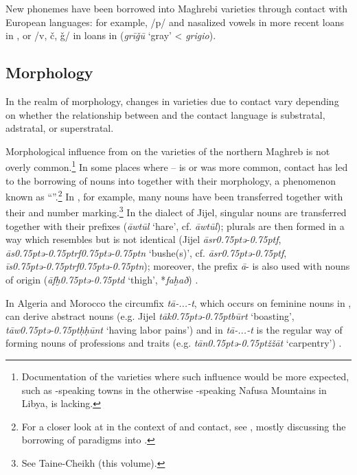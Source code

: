 \documentclass[output=paper]{langsci/langscibook}
\begin{document}
  New phonemes have been borrowed into Maghrebi varieties through contact with European languages: for example, /p/ and nasalized vowels in more recent  loans in  , or /v, č, ǧ/ in  loans in   (\textit{grīǧū} ‘gray’ < \textit{grigio}).

  \subsection{Morphology}\label{Morphology}

In the realm of morphology, changes in  varieties due to contact vary depending on whether the relationship between  and the contact language is substratal, adstratal, or superstratal.

  Morphological influence from  on the  varieties of the northern Maghreb is not overly common.\footnote{Documentation of the varieties where such influence would be more expected, such as -speaking towns in the otherwise -speaking Nafusa Mountains in Libya, is lacking.} In some places where --  is or was more common, contact has led to the borrowing of  nouns into  together with their morphology, a phenomenon known as “”.\footnote{For a closer look at  in the context of  and  contact, see \citet{Kossmann2010}, mostly discussing the borrowing of  paradigms into .} In , for example, many nouns have been transferred together with their  and number marking.\footnote{See Taine-Cheikh (this volume).} In the dialect of Jijel,  singular nouns are transferred together with their prefixes (\textit{āwtūl} ‘hare’, cf.  \textit{āwtūl}); plurals are then formed in a way which resembles  but is not identical (Jijel \textit{āsr\kern 0.75ptǝ\kern -0.75ptf}, \textit{ās\kern 0.75ptǝ\kern -0.75ptrf\kern 0.75ptǝ\kern -0.75ptn} ‘bushe(s)’, cf.   \textit{āsr\kern 0.75ptǝ\kern -0.75ptf}, \textit{īs\kern 0.75ptǝ\kern -0.75ptrf\kern 0.75ptǝ\kern -0.75ptn}); moreover, the prefix \textit{ā}{}- is also used with nouns of  origin (\textit{āfḫ\kern 0.75ptǝ\kern -0.75ptd} ‘thigh’,  *\textit{faḫað}) \citep[302–318]{Marçais1956}.

  In Algeria and Morocco the circumfix \textit{tā-...-t}, which occurs on feminine nouns in , can derive abstract nouns (e.g. Jijel \textit{tāk\kern 0.75ptǝ\kern -0.75ptbūrt} ‘boasting’, \textit{tāw\kern 0.75ptǝ\kern -0.75ptḥḥūnt} ‘having labor pains’) and in   \textit{tā-...-t} is the regular way of forming nouns of professions and traits (e.g. \textit{tān\kern 0.75ptǝ\kern -0.75ptžžā{\R}t} ‘carpentry’) \citep{Kossmann2013chapter}.
\end{document}
